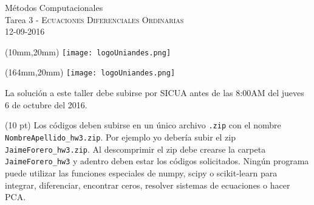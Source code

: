 \documentclass[11pt,letterpaper]{exam}
\begin{document}
\begin{center}
{\Large M\'etodos Computacionales} \\
Tarea 3 - \textsc{Ecuaciones Diferenciales Ordinarias}\\
12-09-2016\\
\end{center}

\begin{textblock*}{40mm}(10mm,20mm)
  \texttt{[image: logoUniandes.png]}
\end{textblock*}

\begin{textblock*}{40mm}(164mm,20mm)
  \texttt{[image: logoUniandes.png]}
\end{textblock*}

\vspace{0.3cm}


\noindent
La solución a este taller debe subirse por SICUA antes de las 8:00AM
del jueves 6 de octubre del 2016. 

\noindent
(10 pt) Los c\'odigos deben subirse en un
\'unico archivo \verb".zip" con el nombre
\verb"NombreApellido_hw3.zip". Por ejemplo yo deber\'ia subir el zip
\verb"JaimeForero_hw3.zip". Al descomprimir el zip debe crearse la
carpeta \verb"JaimeForero_hw3" y adentro deben estar los c\'odigos
solicitados.
Ning\'un programa puede utilizar las funciones especiales de numpy,
scipy o scikit-learn para integrar, diferenciar, encontrar ceros,
resolver sistemas de ecuaciones o hacer PCA.

\vspace{0.3cm}
\end{document}
